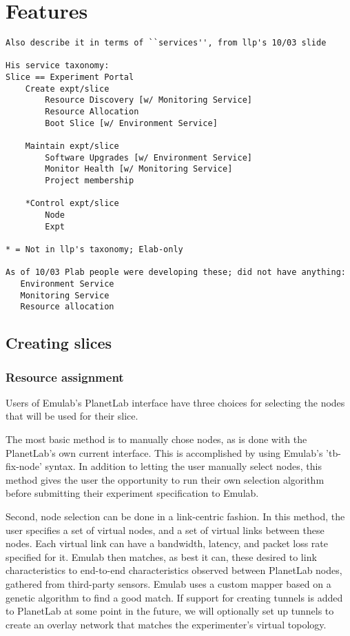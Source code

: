 \section{Features}
\label{features}

\small{
\begin{verbatim}
Also describe it in terms of ``services'', from llp's 10/03 slide

His service taxonomy:
Slice == Experiment Portal
    Create expt/slice
        Resource Discovery [w/ Monitoring Service]
        Resource Allocation
        Boot Slice [w/ Environment Service]

    Maintain expt/slice
        Software Upgrades [w/ Environment Service]
        Monitor Health [w/ Monitoring Service]
        Project membership

    *Control expt/slice
        Node 
        Expt

* = Not in llp's taxonomy; Elab-only

As of 10/03 Plab people were developing these; did not have anything:
   Environment Service
   Monitoring Service
   Resource allocation
\end{verbatim}
}%



\subsection{Creating slices}

\subsubsection{Resource assignment}

Users of Emulab's PlanetLab interface have three choices for selecting the
nodes that will be used for their slice.

The most basic method is to manually chose nodes, as is done with the
PlanetLab's own current interface. This is accomplished by using Emulab's
'tb-fix-node' syntax. In addition to letting the user manually select nodes,
this method gives the user the opportunity to run their own selection algorithm
before submitting their experiment specification to Emulab.

Second, node selection can be done in a link-centric fashion. In this method,
the user specifies a set of virtual nodes, and a set of virtual links between
these nodes. Each virtual link can have a bandwidth, latency, and packet loss
rate specified for it. Emulab then matches, as best it can, these desired to
link characteristics to end-to-end characteristics observed between PlanetLab
nodes, gathered from third-party sensors. Emulab uses a custom mapper based on
a genetic algorithm to find a good match. If support for creating tunnels is
added to PlanetLab at some point in the future, we will optionally set up
tunnels to create an overlay network that matches the experimenter's virtual
topology.

